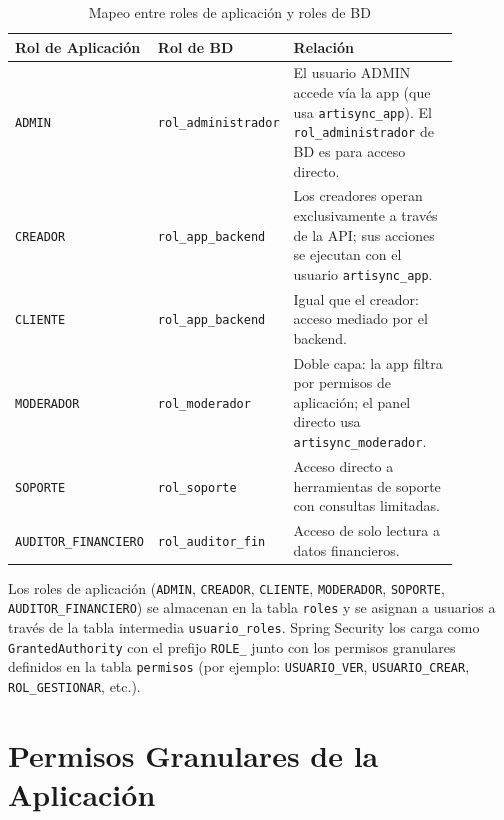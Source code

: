 \documentclass[conference, onecolumn]{IEEEtran}
\begin{document}
\begin{table}[H]
\centering
\caption{Mapeo entre roles de aplicación y roles de BD}
\label{tab:mapeo_roles}
\scriptsize
\begin{tabular}{>{\raggedright\arraybackslash}p{0.20\linewidth} >{\raggedright\arraybackslash}p{0.22\linewidth} >{\raggedright\arraybackslash}p{0.46\linewidth}}
\toprule
\textbf{Rol de Aplicación} & \textbf{Rol de BD} & \textbf{Relación} \\
\midrule
\texttt{ADMIN} & \texttt{rol\_administrador} & El usuario ADMIN accede vía la app (que usa \texttt{artisync\_app}). El \texttt{rol\_administrador} de BD es para acceso directo. \\
\midrule
\texttt{CREADOR} & \texttt{rol\_app\_backend} & Los creadores operan exclusivamente a través de la API; sus acciones se ejecutan con el usuario \texttt{artisync\_app}. \\
\midrule
\texttt{CLIENTE} & \texttt{rol\_app\_backend} & Igual que el creador: acceso mediado por el backend. \\
\midrule
\texttt{MODERADOR} & \texttt{rol\_moderador} & Doble capa: la app filtra por permisos de aplicación; el panel directo usa \texttt{artisync\_moderador}. \\
\midrule
\texttt{SOPORTE} & \texttt{rol\_soporte} & Acceso directo a herramientas de soporte con consultas limitadas. \\
\midrule
\texttt{AUDITOR\_FINANCIERO} & \texttt{rol\_auditor\_fin} & Acceso de solo lectura a datos financieros. \\
\bottomrule
\end{tabular}
\end{table}

Los roles de aplicación (\texttt{ADMIN}, \texttt{CREADOR}, \texttt{CLIENTE}, \texttt{MODERADOR}, \texttt{SOPORTE}, \texttt{AUDITOR\_FINANCIERO}) se almacenan en la tabla \texttt{roles} y se asignan a usuarios a través de la tabla intermedia \texttt{usuario\_roles}. Spring Security los carga como \texttt{GrantedAuthority} con el prefijo \texttt{ROLE\_} junto con los permisos granulares definidos en la tabla \texttt{permisos} (por ejemplo: \texttt{USUARIO\_VER}, \texttt{USUARIO\_CREAR}, \texttt{ROL\_GESTIONAR}, etc.).

\section{Permisos Granulares de la Aplicación}
\end{document}
